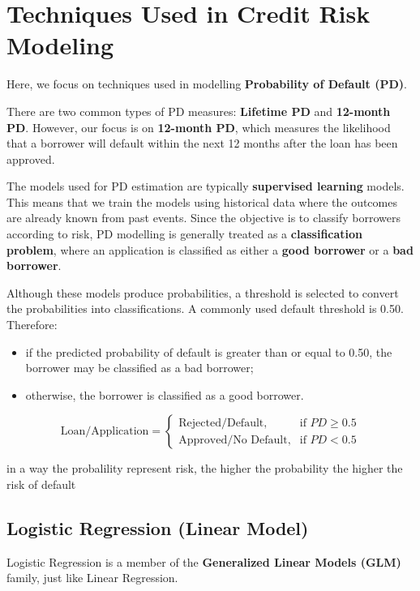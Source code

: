 \documentclass[
  letterpaper,
  DIV=11,
  numbers=noendperiod]{scrartcl}
\providecommand{\tightlist}{%
  \setlength{\itemsep}{0pt}\setlength{\parskip}{0pt}}
\begin{document}
\section{Techniques Used in Credit Risk Modeling}

Here, we focus on techniques used in modelling \textbf{Probability of
Default (PD)}.

There are two common types of PD measures: \textbf{Lifetime PD} and
\textbf{12-month PD}. However, our focus is on \textbf{12-month PD},
which measures the likelihood that a borrower will default within the
next 12 months after the loan has been approved.

The models used for PD estimation are typically \textbf{supervised
learning} models. This means that we train the models using historical
data where the outcomes are already known from past events. Since the
objective is to classify borrowers according to risk, PD modelling is
generally treated as a \textbf{classification problem}, where an
application is classified as either a \textbf{good borrower} or a
\textbf{bad borrower}.

Although these models produce probabilities, a threshold is selected to
convert the probabilities into classifications. A commonly used default
threshold is 0.50. Therefore:

\begin{itemize}
\tightlist
\item
  if the predicted probability of default is greater than or equal to
  0.50, the borrower may be classified as a bad borrower;
\item
  otherwise, the borrower is classified as a good borrower.
\end{itemize}

\[\text{Loan/Application} = \begin{cases} \text{Rejected/Default}, & \text{if } PD \geq 0.5 \\ \text{Approved/No Default}, & \text{if } PD < 0.5 \end{cases}\]

in a way the probalility represent risk, the higher the probability the
higher the risk of default

\subsection{Logistic Regression (Linear Model)}

Logistic Regression is a member of the \textbf{Generalized Linear Models
(GLM)} family, just like Linear Regression.
\end{document}
